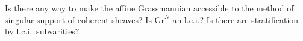 
Is there any way to make the affine Grassmannian accessible to the method of singular support of coherent sheaves?
Is $\mathrm{Gr}^N$ an l.c.i.?
Is there are stratification by l.c.i.~subvarities?
